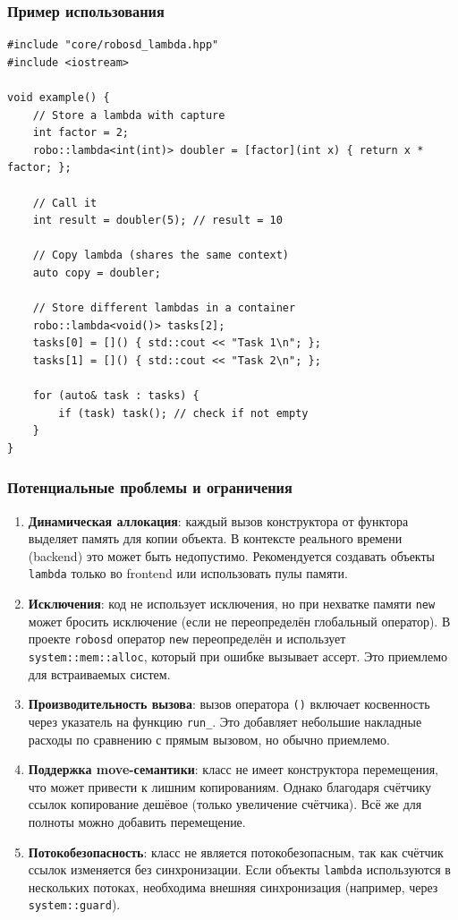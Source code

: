 \documentclass[a4paper,12pt]{article}
\begin{document}
\subsubsection{Пример использования}

\begin{lstlisting}[caption={Создание и использование lambda}]
#include "core/robosd_lambda.hpp"
#include <iostream>

void example() {
    // Store a lambda with capture
    int factor = 2;
    robo::lambda<int(int)> doubler = [factor](int x) { return x * factor; };

    // Call it
    int result = doubler(5); // result = 10

    // Copy lambda (shares the same context)
    auto copy = doubler;

    // Store different lambdas in a container
    robo::lambda<void()> tasks[2];
    tasks[0] = []() { std::cout << "Task 1\n"; };
    tasks[1] = []() { std::cout << "Task 2\n"; };

    for (auto& task : tasks) {
        if (task) task(); // check if not empty
    }
}
\end{lstlisting}

\subsubsection{Потенциальные проблемы и ограничения}

\begin{enumerate}
    \item \textbf{Динамическая аллокация}: каждый вызов конструктора от функтора выделяет память для копии объекта. В контексте реального времени (backend) это может быть недопустимо. Рекомендуется создавать объекты \texttt{lambda} только во frontend или использовать пулы памяти.
    \item \textbf{Исключения}: код не использует исключения, но при нехватке памяти \texttt{new} может бросить исключение (если не переопределён глобальный оператор). В проекте \texttt{robosd} оператор \texttt{new} переопределён и использует \texttt{system::mem::alloc}, который при ошибке вызывает ассерт. Это приемлемо для встраиваемых систем.
    \item \textbf{Производительность вызова}: вызов оператора \texttt{()} включает косвенность через указатель на функцию \texttt{run\_}. Это добавляет небольшие накладные расходы по сравнению с прямым вызовом, но обычно приемлемо.
    \item \textbf{Поддержка move-семантики}: класс не имеет конструктора перемещения, что может привести к лишним копированиям. Однако благодаря счётчику ссылок копирование дешёвое (только увеличение счётчика). Всё же для полноты можно добавить перемещение.
    \item \textbf{Потокобезопасность}: класс не является потокобезопасным, так как счётчик ссылок изменяется без синхронизации. Если объекты \texttt{lambda} используются в нескольких потоках, необходима внешняя синхронизация (например, через \texttt{system::guard}).
\end{enumerate}
\end{document}
